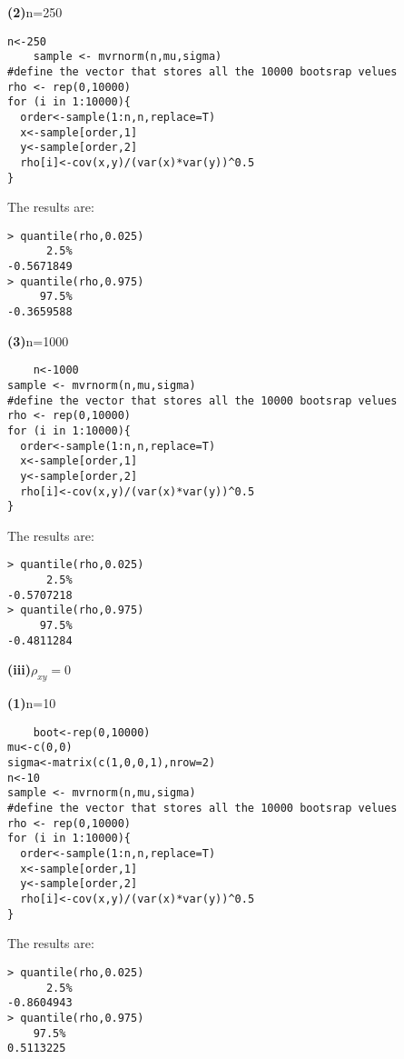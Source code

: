 \documentclass[letterpaper,11pt]{article}
\begin{document}
\begin{addmargin}[0em]{0em} \textbf{(2)}n=250\par \end{addmargin}
\begin{lstlisting}
n<-250
	sample <- mvrnorm(n,mu,sigma)
#define the vector that stores all the 10000 bootsrap velues
rho <- rep(0,10000)
for (i in 1:10000){
  order<-sample(1:n,n,replace=T)
  x<-sample[order,1]
  y<-sample[order,2]
  rho[i]<-cov(x,y)/(var(x)*var(y))^0.5
}
\end{lstlisting}
The results are:
\begin{lstlisting}
> quantile(rho,0.025)
      2.5% 
-0.5671849 
> quantile(rho,0.975)
     97.5% 
-0.3659588 
\end{lstlisting}

\begin{addmargin}[0em]{0em} \textbf{(3)}n=1000\par \end{addmargin}
\begin{lstlisting}
	n<-1000
sample <- mvrnorm(n,mu,sigma)
#define the vector that stores all the 10000 bootsrap velues
rho <- rep(0,10000)
for (i in 1:10000){
  order<-sample(1:n,n,replace=T)
  x<-sample[order,1]
  y<-sample[order,2]
  rho[i]<-cov(x,y)/(var(x)*var(y))^0.5
}
\end{lstlisting}
The results are:
\begin{lstlisting}
> quantile(rho,0.025)
      2.5% 
-0.5707218 
> quantile(rho,0.975)
     97.5% 
-0.4811284 
\end{lstlisting}



\begin{addmargin}[-1.1em]{0em} \textbf{(iii)}$\rho_{xy}=0$\par \end{addmargin}


\begin{addmargin}[0em]{0em} \textbf{(1)}n=10\par \end{addmargin}
\begin{lstlisting}
	boot<-rep(0,10000)
mu<-c(0,0)
sigma<-matrix(c(1,0,0,1),nrow=2)
n<-10
sample <- mvrnorm(n,mu,sigma)
#define the vector that stores all the 10000 bootsrap velues
rho <- rep(0,10000)
for (i in 1:10000){
  order<-sample(1:n,n,replace=T)
  x<-sample[order,1]
  y<-sample[order,2]
  rho[i]<-cov(x,y)/(var(x)*var(y))^0.5
}
\end{lstlisting}
The results are:
\begin{lstlisting}
> quantile(rho,0.025)
      2.5% 
-0.8604943 
> quantile(rho,0.975)
    97.5% 
0.5113225 
\end{lstlisting}
\end{document}
